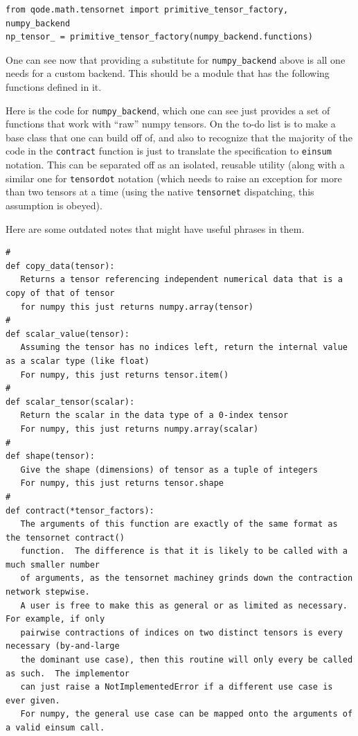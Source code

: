 \documentclass[12pt,letterpaper]{article}
\begin{document}
\begin{lstlisting}
from qode.math.tensornet import primitive_tensor_factory, numpy_backend
np_tensor_ = primitive_tensor_factory(numpy_backend.functions)
\end{lstlisting}

One can see now that providing a substitute for \texttt{numpy\_backend} above is all one needs for a custom
backend.  This should be a module that has the following functions defined in it.

Here is the code for \texttt{numpy\_backend}, which one can see just provides a set
of functions that work with ``raw'' numpy tensors.  On the to-do list is to make a
base class that one can build off of, and also to recognize that the majority of the code
in the \texttt{contract} function is just to translate the specification to \texttt{einsum}
notation.  This can be separated off as an isolated, reusable utility (along with a similar
one for \texttt{tensordot} notation (which needs to raise an exception for more than two
tensors at a time (using the native \texttt{tensornet} dispatching, this assumption is obeyed).



Here are some outdated notes that might have useful phrases in them.

\begin{lstlisting}
#
def copy_data(tensor):
   Returns a tensor referencing independent numerical data that is a copy of that of tensor
   for numpy this just returns numpy.array(tensor)
#
def scalar_value(tensor):
   Assuming the tensor has no indices left, return the internal value as a scalar type (like float)
   For numpy, this just returns tensor.item()
#
def scalar_tensor(scalar):
   Return the scalar in the data type of a 0-index tensor
   For numpy, this just returns numpy.array(scalar)
#
def shape(tensor):
   Give the shape (dimensions) of tensor as a tuple of integers
   For numpy, this just returns tensor.shape
#
def contract(*tensor_factors):
   The arguments of this function are exactly of the same format as the tensornet contract()
   function.  The difference is that it is likely to be called with a much smaller number
   of arguments, as the tensornet machiney grinds down the contraction network stepwise.
   A user is free to make this as general or as limited as necessary.  For example, if only
   pairwise contractions of indices on two distinct tensors is every necessary (by-and-large
   the dominant use case), then this routine will only every be called as such.  The implementor
   can just raise a NotImplementedError if a different use case is ever given.
   For numpy, the general use case can be mapped onto the arguments of a valid einsum call.
\end{lstlisting}
\end{document}
